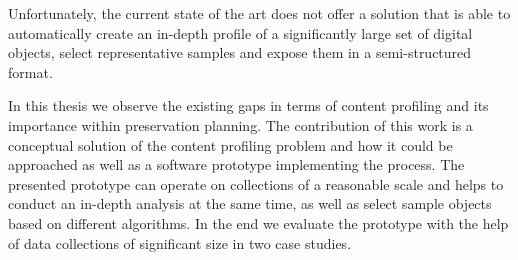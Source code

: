 Unfortunately, the current state of the art does not offer a solution that is able to automatically create an in-depth profile of a significantly large set of digital objects, select representative samples and expose them in a semi-structured format.

In this thesis we observe the existing gaps in terms of content profiling and its importance within preservation
planning.
The contribution of this work is a conceptual solution of the content profiling problem and how it could be approached as well as a software prototype implementing the process.
The presented prototype can operate on collections of a reasonable scale and helps to conduct an in-depth analysis at the same time, as well as select sample objects based on different algorithms.
In the end we evaluate the prototype with the help of data collections of significant size in two case studies.